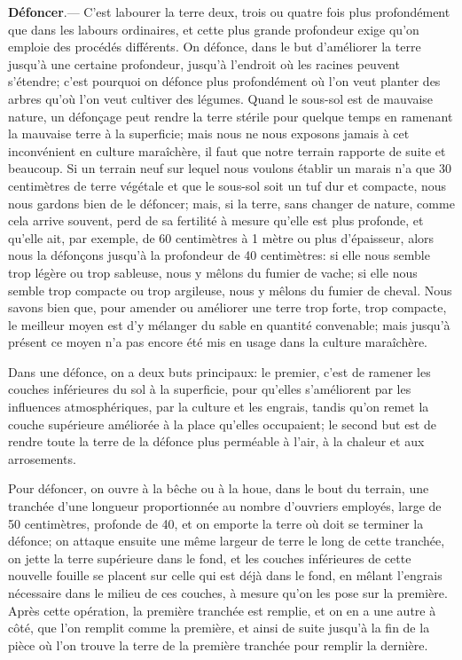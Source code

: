 \documentclass[10pt,a4paper]{book}
\begin{document}
\textbf{Défoncer}.--- C'est labourer la terre deux, trois ou quatre fois plus profondément que dans les labours ordinaires, et cette plus grande profondeur exige qu'on emploie des procédés différents. On défonce, dans le but d'améliorer la terre jusqu'à une certaine profondeur, jusqu'à l'endroit où les racines peuvent s'étendre; c'est pourquoi on défonce plus profondément où l'on veut planter des arbres qu'où l'on veut cultiver des légumes. Quand le sous-sol est de mauvaise nature, un défonçage peut rendre la terre stérile pour quelque temps en ramenant la mauvaise terre à la superficie; mais nous ne nous exposons jamais à cet inconvénient en culture maraîchère, il faut que notre terrain rapporte de suite et beaucoup. Si un terrain neuf sur lequel nous voulons établir un marais n'a que 30 centimètres de terre végétale et que le sous-sol soit un tuf dur et compacte, nous nous gardons bien de le défoncer; mais, si la terre, sans changer de nature, comme cela arrive souvent, perd de sa fertilité à mesure qu'elle est plus profonde, et qu'elle ait, par exemple, de 60 centimètres à 1 mètre ou plus d'épaisseur, alors nous la défonçons jusqu'à la profondeur de 40 centimètres: si elle nous semble trop légère ou trop sableuse, nous y mêlons du fumier de vache; si elle nous semble trop compacte ou trop argileuse, nous y mêlons du fumier de cheval. Nous savons bien que, pour amender ou améliorer une terre trop forte, trop compacte, le meilleur moyen est d'y mélanger du sable en quantité convenable; mais jusqu'à présent ce moyen n'a pas encore été mis en usage dans la culture maraîchère.

Dans une défonce, on a deux buts principaux: le premier, c'est de ramener les couches inférieures du sol à la superficie, pour qu'elles s'améliorent par les influences atmosphériques, par la culture et les engrais, tandis qu'on remet la couche supérieure améliorée à la place qu'elles occupaient; le second but est de rendre toute la terre de la défonce plus perméable à l'air, à la chaleur et aux arrosements.

Pour défoncer, on ouvre à la bêche ou à la houe, dans le bout du terrain, une tranchée d'une longueur proportionnée au nombre d'ouvriers employés, large de 50 centimètres, profonde de 40, et on emporte la terre où doit se terminer la défonce; on attaque ensuite une même largeur de terre le long de cette tranchée, on jette la terre supérieure dans le fond, et les couches inférieures de cette nouvelle fouille se placent sur celle qui est déjà dans le fond, en mêlant l'engrais nécessaire dans le milieu de ces couches, à mesure qu'on les pose sur la première. Après cette opération, la première tranchée est remplie, et on en a une autre à côté, que l'on remplit comme la première, et ainsi de suite jusqu'à la fin de la pièce où l'on trouve la terre de la première tranchée pour remplir la dernière.
\end{document}
